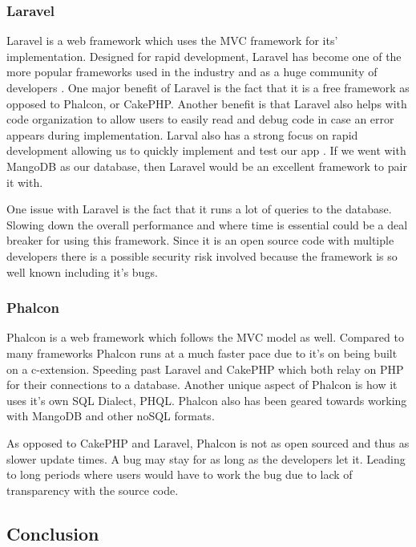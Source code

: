 \documentclass[onecolumn, draftclsnofoot,10pt, compsoc]{IEEEtran}
\begin{document}
\subsubsection{Laravel}

Laravel is a web framework which uses the MVC framework for its’ implementation. Designed for rapid development, Laravel has become one of the more popular frameworks used in the industry and as a huge community of developers \cite{coderseye}. One major benefit of Laravel is the fact that it is a free framework as opposed to Phalcon, or CakePHP. Another benefit is that Laravel also helps with code organization to allow users to easily read and debug code in case an error appears during implementation. Larval also has a strong focus on rapid development allowing us to quickly implement and test our app \cite{laravel}. If we went with MangoDB as our database, then Laravel would be an excellent framework to pair it with.

One issue with Laravel is the fact that it runs a lot of queries to the database. Slowing down the overall performance and where time is essential could be a deal breaker for using this framework. Since it is an open source code with multiple developers there is a possible security risk involved because the framework is so well known including it’s bugs. 

\subsubsection{Phalcon}

Phalcon is a web framework which follows the MVC model as well. Compared to many frameworks Phalcon runs at a much faster pace due to it’s on being built on a c-extension. Speeding past Laravel and CakePHP which both relay on PHP for their connections to a database. Another unique aspect of Phalcon is how it uses it’s own SQL Dialect, PHQL. Phalcon also has been geared towards working with MangoDB and other noSQL formats. 

As opposed to CakePHP and Laravel, Phalcon is not as open sourced and thus as slower update times. A bug may stay for as long as the developers let it. Leading to long periods where users would have to work the bug due to lack of transparency with the source code.

\subsection{Conclusion}
\end{document}
